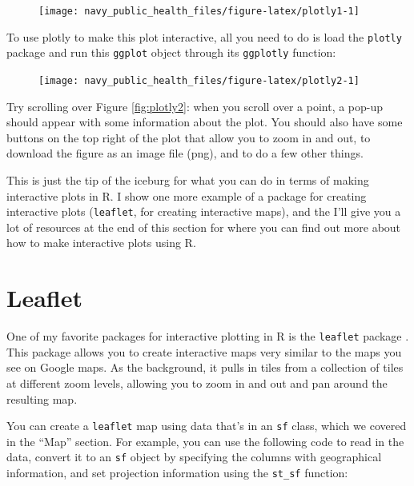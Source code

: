 \documentclass[]{tufte-book}
\newenvironment{Shaded}{}{}
\newcommand{\KeywordTok}[1]{\textcolor[rgb]{0.00,0.44,0.13}{\textbf{#1}}}
\newcommand{\NormalTok}[1]{#1}
\newcommand{\OperatorTok}[1]{\textcolor[rgb]{0.40,0.40,0.40}{#1}}
\newcommand{\StringTok}[1]{\textcolor[rgb]{0.25,0.44,0.63}{#1}}
\begin{document}
\begin{figure}
\texttt{[image: navy\_public\_health\_files/figure-latex/plotly1-1]} \end{figure}

To use plotly to make this plot interactive, all you need to do is load the \texttt{plotly} package and
run this \texttt{ggplot} object
through its \texttt{ggplotly} function:

\begin{Shaded}
\end{Shaded}

\begin{figure}
\texttt{[image: navy\_public\_health\_files/figure-latex/plotly2-1]} \end{figure}

Try scrolling over Figure \ref{fig:plotly2}: when you scroll over a point, a pop-up should
appear with some information about the plot. You should also have some buttons on the top
right of the plot that allow you to zoom in and out, to download the figure as an image
file (png), and to do a few other things.

This is just the tip of the iceburg for what you can do in terms of making interactive plots
in R. I show one more example of a package for creating interactive plots (\texttt{leaflet}, for
creating interactive maps), and the I'll give you a lot of resources at the end of this
section for where you can find out more about how to make interactive plots using R.

\hypertarget{leaflet}{%
\section{Leaflet}\label{leaflet}}

One of my favorite packages for interactive plotting in R is the \texttt{leaflet} package \citep{R-leaflet}.
This package allows you to create interactive maps very similar to the maps you see on Google maps.
As the background, it pulls in tiles from a collection of tiles at different zoom levels, allowing
you to zoom in and out and pan around the resulting map.

You can create a \texttt{leaflet} map using data that's in an \texttt{sf} class, which we covered in the ``Map''
section. For example, you can use the following code to read in the data, convert it to an \texttt{sf}
object by specifying the columns with geographical information, and set projection information
using the \texttt{st\_sf} function:
\end{document}
